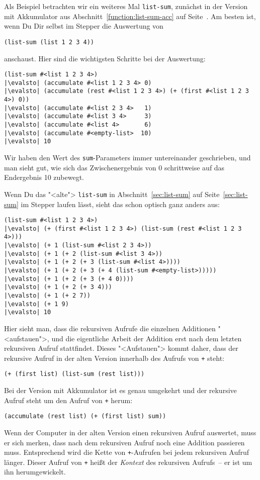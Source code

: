 Als Beispiel betrachten wir ein weiteres Mal \lstinline{list-sum},
zunächst in der Version mit Akkumulator aus
Abschnitt~\ref{function:list-sum-acc} auf
Seite~\pageref{function:list-sum-acc}.  Am besten ist, wenn Du Dir
selbst im Stepper die Auswertung von
\begin{lstlisting}
(list-sum (list 1 2 3 4))
\end{lstlisting}
%
anschaust.  Hier sind die wichtigsten Schritte bei der Auswertung:
%
\begin{lstlisting}
(list-sum #<list 1 2 3 4>)
|\evalsto| (accumulate #<list 1 2 3 4> 0)
|\evalsto| (accumulate (rest #<list 1 2 3 4>) (+ (first #<list 1 2 3 4>) 0))
|\evalsto| (accumulate #<list 2 3 4>   1)
|\evalsto| (accumulate #<list 3 4>     3)
|\evalsto| (accumulate #<list 4>       6)
|\evalsto| (accumulate #<empty-list>  10)
|\evalsto| 10
\end{lstlisting}
%
Wir haben den Wert des \lstinline{sum}-Parameters immer untereinander
geschrieben, und man sieht gut, wie sich das Zwischenergebnis von 0
schrittweise auf das Endergebnis 10 zubewegt.

Wenn Du das "<alte"> \lstinline{list-sum} in
Abschnitt~\ref{sec:list-sum} auf Seite~\ref{sec:list-sum} im Stepper
laufen lässt, sieht das schon optisch ganz anders aus:
%
\begin{lstlisting}
(list-sum #<list 1 2 3 4>)
|\evalsto| (+ (first #<list 1 2 3 4>) (list-sum (rest #<list 1 2 3 4>)))
|\evalsto| (+ 1 (list-sum #<list 2 3 4>))
|\evalsto| (+ 1 (+ 2 (list-sum #<list 3 4>))
|\evalsto| (+ 1 (+ 2 (+ 3 (list-sum #<list 4>))))
|\evalsto| (+ 1 (+ 2 (+ 3 (+ 4 (list-sum #<empty-list>)))))
|\evalsto| (+ 1 (+ 2 (+ 3 (+ 4 0))))
|\evalsto| (+ 1 (+ 2 (+ 3 4)))
|\evalsto| (+ 1 (+ 2 7))
|\evalsto| (+ 1 9)
|\evalsto| 10
\end{lstlisting}
%
Hier sieht man, dass die rekursiven Aufrufe die einzelnen Additionen
"<aufstauen">, und die eigentliche Arbeit der Addition erst nach dem
letzten rekursiven Aufruf stattfindet.  Dieses "<Aufstauen"> kommt
daher, dass der rekursive Aufruf in der alten Version innerhalb des
Aufrufs von \lstinline{+} steht:
%
\begin{lstlisting}
(+ (first list) (list-sum (rest list)))
\end{lstlisting}
%
Bei der Version mit Akkumulator ist es genau umgekehrt und der
rekursive Aufruf steht um den Aufruf von \lstinline{+} herum:
%
\begin{lstlisting}
(accumulate (rest list) (+ (first list) sum))
\end{lstlisting}
%
Wenn der Computer in der alten Version einen rekursiven Aufruf
auswertet, muss er sich merken, dass nach dem rekursiven Aufruf noch
eine Addition passieren muss.  Entsprechend wird die Kette von
\lstinline{+}-Aufrufen bei jedem rekursiven Aufruf länger.  Dieser
Aufruf von \lstinline{+} heißt der \textit{Kontext} des
rekursiven Aufrufs~-- er ist um ihn herumgewickelt.

